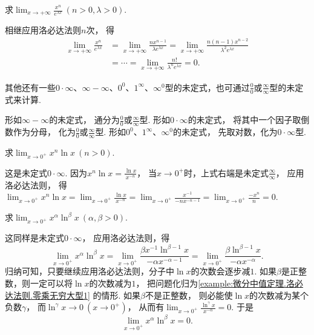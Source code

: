 \begin{example}\label{example:微分中值定理.洛必达法则.无穷大比无穷大型2}
求\(\lim_{x\to+\infty} \frac{x^n}{e^{\lambda x}}\ (n>0,\lambda>0)\).
\begin{solution}
相继应用洛必达法则\(n\)次，
得\begin{align*}
	\lim_{x\to+\infty} \frac{x^n}{e^{\lambda x}}
	&= \lim_{x\to+\infty} \frac{n x^{n-1}}{\lambda e^{\lambda x}} %
	= \lim_{x\to+\infty} \frac{n(n-1) x^{n-2}}{\lambda^2 e^{\lambda x}} \\
	&= \dotsb = \lim_{x\to+\infty} \frac{n!}{\lambda^n e^{\lambda x}}
	= 0.
\end{align*}
\end{solution}
\end{example}

其他还有一些\(0 \cdot \infty\)、\(\infty - \infty\)、\(0^0\)、\(1^\infty\)、\(\infty^0\)型的未定式，也可通过\(\frac{0}{0}\)或\(\frac{\infty}{\infty}\)型的未定式来计算.

形如\(\infty - \infty\)的未定式，
通分为\(\frac{0}{0}\)或\(\frac{\infty}{\infty}\)型.
形如\(0 \cdot \infty\)的未定式，
将其中一个因子取倒数作为分母，
化为\(\frac{0}{0}\)或\(\frac{\infty}{\infty}\)型.
形如\(0^0\)、\(1^\infty\)、\(\infty^0\)的未定式，
先取对数，化为\(0 \cdot \infty\)型.

\begin{example}\label{example:微分中值定理.洛必达法则.零乘无穷大型1}
求\(\lim_{x\to0^+} x^n \ln x\ (n > 0)\).
\begin{solution}
这是未定式\(0\cdot\infty\).
因为\(x^n \ln x = \frac{\ln x}{x^{-n}}\)，
当\(x\to0^+\)时，上式右端是未定式\(\frac{\infty}{\infty}\)，
应用洛必达法则，
得\(\lim_{x\to0^+} x^n \ln x
= \lim_{x\to0^+} \frac{\ln x}{x^{-n}}
= \lim_{x\to0^+} \frac{x^{-1}}{-nx^{-n-1}}
= \lim_{x\to0^+} \frac{-x^n}{n}
= 0\).
\end{solution}
\end{example}
\begin{example}\label{example:微分中值定理.洛必达法则.零乘无穷大型2}
求\(\lim_{x\to0^+} x^\alpha \ln^\beta x\ (\alpha,\beta>0)\).
\begin{solution}
这同样是未定式\(0\cdot\infty\)，
应用洛必达法则，得\[
	\lim_{x\to0^+} x^\alpha \ln^\beta x
	= \lim_{x\to0^+} \frac{\beta x^{-1} \ln^{\beta-1} x}{-\alpha x^{-\alpha-1}}
	= \lim_{x\to0^+} \frac{\beta \ln^{\beta-1} x}{-\alpha x^{-\alpha}}.
\]
归纳可知，只要继续应用洛必达法则，分子中\(\ln x\)的次数会逐步减\(1\).
如果\(\beta\)是正整数，则一定可以将\(\ln x\)的次数减为\(1\)，
把问题化归为\cref{example:微分中值定理.洛必达法则.零乘无穷大型1} 的情形.
如果\(\beta\)不是正整数，
则必能使\(\ln x\)的次数减为某个负数\(\gamma\)，
而\(\ln^\gamma x \to 0\ (x\to0^+)\)，
从而有\(\lim_{x\to0^+} \frac{\ln^\gamma x}{x^{-\alpha}} = 0\).
于是\[
	\lim_{x\to0^+} x^\alpha \ln^\beta x = 0.
\]
\end{solution}
\end{example}

